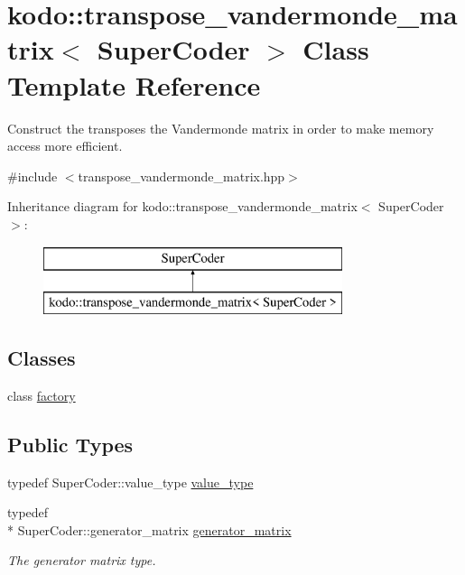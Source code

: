 \hypertarget{classkodo_1_1transpose__vandermonde__matrix}{\section{kodo\-:\-:transpose\-\_\-vandermonde\-\_\-matrix$<$ Super\-Coder $>$ Class Template Reference}
\label{classkodo_1_1transpose__vandermonde__matrix}
}


Construct the transposes the Vandermonde matrix in order to make memory access more efficient.  




{\ttfamily \#include $<$transpose\-\_\-vandermonde\-\_\-matrix.\-hpp$>$}

Inheritance diagram for kodo\-:\-:transpose\-\_\-vandermonde\-\_\-matrix$<$ Super\-Coder $>$\-:\begin{figure}[H]
\begin{center}
\leavevmode
\includegraphics[height=2.000000cm]{classkodo_1_1transpose__vandermonde__matrix}
\end{center}
\end{figure}
\subsection*{Classes}
\begin{DoxyCompactItemize}
\item 
class \hyperlink{classkodo_1_1transpose__vandermonde__matrix_1_1factory}{factory}
\end{DoxyCompactItemize}
\subsection*{Public Types}
\begin{DoxyCompactItemize}
\item 
typedef Super\-Coder\-::value\-\_\-type \hyperlink{classkodo_1_1transpose__vandermonde__matrix_a24fd34e538dbeb7b1ae43b1c462cf2ee}{value\-\_\-type}
\begin{DoxyCompactList}\small\item\em \end{DoxyCompactList}\item 
\hypertarget{classkodo_1_1transpose__vandermonde__matrix_aa009fc588662c9cf5495dad11cfbabab}{typedef \\*
Super\-Coder\-::generator\-\_\-matrix \hyperlink{classkodo_1_1transpose__vandermonde__matrix_aa009fc588662c9cf5495dad11cfbabab}{generator\-\_\-matrix}}\label{classkodo_1_1transpose__vandermonde__matrix_aa009fc588662c9cf5495dad11cfbabab}

\begin{DoxyCompactList}\small\item\em The generator matrix type. \end{DoxyCompactList}\end{DoxyCompactItemize}


